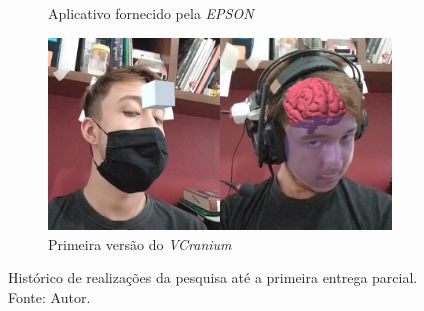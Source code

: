 \begin{figure}[ht]
\begin{subfigure}{0.45\textwidth}
        \caption{Aplicativo fornecido pela \textit{EPSON}}
        \label{fig:papercar}
    \end{subfigure}
    \begin{subfigure}{0.45\textwidth}
        \centering
        \includegraphics[width=.95\linewidth]{figuras/VCranium.png}
        \caption{Primeira versão do \textit{VCranium}}
        \label{fig:vcranium_alpha}
    \end{subfigure}
    \caption{Histórico de realizações da pesquisa até a primeira entrega parcial. Fonte: Autor.}
    \label{fig:historico}
\end{figure}


